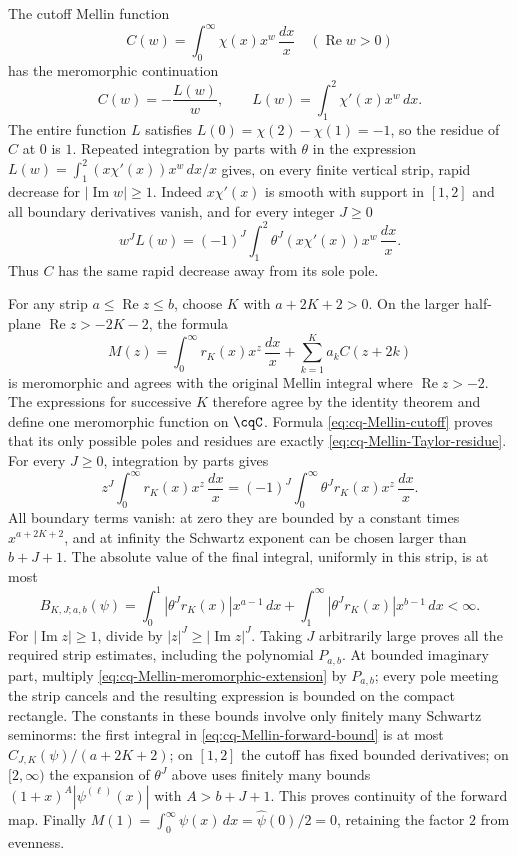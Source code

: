 The cutoff Mellin function
\[
 C(w)=\int_0^\infty\chi(x)x^w\,\frac{dx}{x}
       \quad(\operatorname{Re}w>0)
\]
has the meromorphic continuation
\begin{equation}\label{eq:cq-Mellin-cutoff}
 C(w)=-\frac{L(w)}{w},\qquad
 L(w)=\int_1^2\chi'(x)x^w\,dx.
\end{equation}
The entire function $L$ satisfies $L(0)=\chi(2)-\chi(1)=-1$,
so the residue of $C$ at $0$ is $1$. Repeated integration by
parts with $\theta$ in the expression
$L(w)=\int_1^2(x\chi'(x))x^w\,dx/x$ gives, on every finite
vertical strip, rapid decrease for $|\operatorname{Im}w|\geq1$.
Indeed $x\chi'(x)$ is smooth with support in $[1,2]$ and all
boundary derivatives vanish, and for every integer $J\geq0$
\[
 w^JL(w)=(-1)^J\int_1^2
       \theta^J(x\chi'(x))x^w\,\frac{dx}{x}.
\]
Thus $C$ has the same rapid decrease away from its sole pole.

For any strip $a\leq\operatorname{Re}z\leq b$, choose $K$
with $a+2K+2>0$. On the larger half-plane
$\operatorname{Re}z>-2K-2$, the formula
\begin{equation}\label{eq:cq-Mellin-meromorphic-extension}
 M(z)=\int_0^\infty r_K(x)x^z\,\frac{dx}{x}
                     +\sum_{k=1}^K a_k C(z+2k)
\end{equation}
is meromorphic and agrees with the original Mellin integral where
$\operatorname{Re}z>-2$. The expressions for successive $K$
therefore agree by the identity theorem and define one meromorphic
function on $\cqC$. Formula \eqref{eq:cq-Mellin-cutoff} proves
that its only possible poles and residues are exactly
\eqref{eq:cq-Mellin-Taylor-residue}.
For every $J\geq0$, integration by parts gives
\[
 z^J\int_0^\infty r_K(x)x^z\,\frac{dx}{x}
       =(-1)^J\int_0^\infty\theta^Jr_K(x)x^z\,\frac{dx}{x}.
\]
All boundary terms vanish: at zero they are bounded by a constant
times $x^{a+2K+2}$, and at infinity the Schwartz exponent can
be chosen larger than $b+J+1$. The absolute value of the final
integral, uniformly in this strip, is at most
\begin{equation}\label{eq:cq-Mellin-forward-bound}
 B_{K,J;a,b}(\psi)=
 \int_0^1|\theta^Jr_K(x)|x^{a-1}\,dx
 +\int_1^\infty|\theta^Jr_K(x)|x^{b-1}\,dx<\infty.
\end{equation}
For $|\operatorname{Im}z|\geq1$, divide by $|z|^J\geq
|\operatorname{Im}z|^J$. Taking $J$ arbitrarily large proves
all the required strip estimates, including the polynomial
$P_{a,b}$. At bounded imaginary part, multiply
\eqref{eq:cq-Mellin-meromorphic-extension} by $P_{a,b}$;
every pole meeting the strip cancels and the resulting expression
is bounded on the compact rectangle. The constants in these
bounds involve only finitely many Schwartz seminorms:
the first integral in \eqref{eq:cq-Mellin-forward-bound} is
at most $C_{J,K}(\psi)/(a+2K+2)$; on $[1,2]$ the cutoff
has fixed bounded derivatives; on $[2,\infty)$ the expansion
of $\theta^J$ above uses finitely many bounds
$(1+x)^A|\psi^{(\ell)}(x)|$ with $A>b+J+1$.
This proves continuity of the forward map.
Finally $M(1)=\int_0^\infty\psi(x)\,dx
=\widehat\psi(0)/2=0$, retaining the factor $2$ from evenness.

